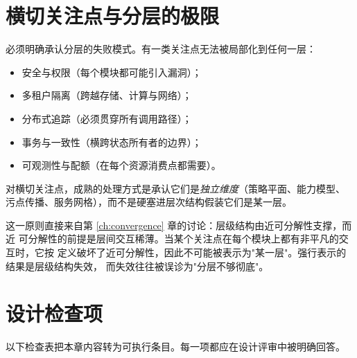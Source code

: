 \section{横切关注点与分层的极限}\label{sec:crosscutting}

必须明确承认分层的失败模式。有一类关注点无法被局部化到任何一层：

\begin{itemize}
\item 安全与权限（每个模块都可能引入漏洞）；
\item 多租户隔离（跨越存储、计算与网络）；
\item 分布式追踪（必须贯穿所有调用路径）；
\item 事务与一致性（横跨状态所有者的边界）；
\item 可观测性与配额（在每个资源消费点都需要）。
\end{itemize}

\begin{principle}[横切关注点是独立维度]\label{pr:crosscutting}
对横切关注点，成熟的处理方式是承认它们是\emph{独立维度}（策略平面、能力模型、
污点传播、服务网格），而不是硬塞进层次结构假装它们是某一层。
\end{principle}

这一原则直接来自第 \ref{ch:convergence} 章的讨论：层级结构由近可分解性支撑，而近
可分解性的前提是层间交互稀薄。当某个关注点在每个模块上都有非平凡的交互时，它按
定义破坏了近可分解性，因此不可能被表示为"某一层"。强行表示的结果是层级结构失效，
而失效往往被误诊为"分层不够彻底"。

\section{设计检查项}\label{sec:checklist}

以下检查表把本章内容转为可执行条目。每一项都应在设计评审中被明确回答。

